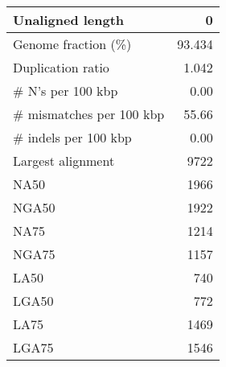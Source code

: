 \documentclass[12pt,a4paper]{article}
\begin{document}
\begin{table}[ht]
\begin{center}
\begin{tabular}{|l*{1}{|r}|}
Unaligned length & 0 \\ \hline
Genome fraction (\%) & 93.434 \\ \hline
Duplication ratio & 1.042 \\ \hline
\# N's per 100 kbp & 0.00 \\ \hline
\# mismatches per 100 kbp & 55.66 \\ \hline
\# indels per 100 kbp & 0.00 \\ \hline
Largest alignment & 9722 \\ \hline
NA50 & 1966 \\ \hline
NGA50 & 1922 \\ \hline
NA75 & 1214 \\ \hline
NGA75 & 1157 \\ \hline
LA50 & 740 \\ \hline
LGA50 & 772 \\ \hline
LA75 & 1469 \\ \hline
LGA75 & 1546 \\ \hline
\end{tabular}
\end{center}
\end{table}
\end{document}
